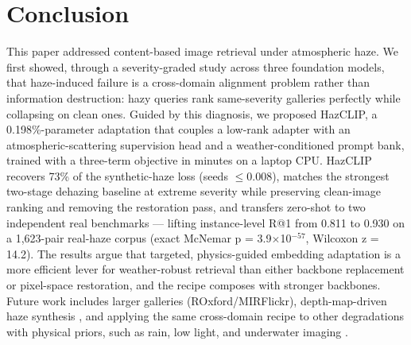 \documentclass[journal]{IEEEtran}
\begin{document}
\section{Conclusion}
This paper addressed content-based image retrieval under atmospheric haze.
We first showed, through a severity-graded study across three foundation
models, that haze-induced failure is a cross-domain alignment problem
rather than information destruction: hazy queries rank same-severity
galleries perfectly while collapsing on clean ones. Guided by this
diagnosis, we proposed HazCLIP, a 0.198\%-parameter adaptation that couples
a low-rank adapter with an atmospheric-scattering supervision head and a
weather-conditioned prompt bank, trained with a three-term objective in
minutes on a laptop CPU. HazCLIP recovers 73\% of the synthetic-haze loss
(seeds $\leq$0.008), matches the strongest two-stage dehazing baseline at
extreme severity while preserving clean-image ranking and removing the
restoration pass, and transfers zero-shot to two independent real
benchmarks --- lifting instance-level R@1 from 0.811 to 0.930 on a
1,623-pair real-haze corpus (exact McNemar p = 3.9$\times$10$^{-57}$, Wilcoxon
z = 14.2). The results argue that targeted, physics-guided embedding
adaptation is a more efficient lever for weather-robust retrieval than
either backbone replacement or pixel-space restoration, and the recipe
composes with stronger backbones. Future work includes larger galleries
(ROxford/MIRFlickr), depth-map-driven haze synthesis
\cite{zhang2026dahaze}, and applying the same cross-domain recipe to other
degradations with physical priors, such as rain, low light, and underwater
imaging \cite{li2021underwater}.




\end{document}
